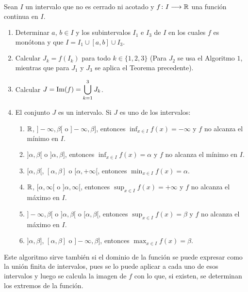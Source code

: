 \begin{algocal}
Sean $I$ un intervalo que no es cerrado ni acotado y $f\colon I\longrightarrow \mathbb{R}$ una función continua en $I$.

\begin{enumerate}
\item Determinar $a$, $b\in I$ y los subintervalos $I_1$ e $I_3$ de $I$ en los cuales $f$ es
    monótona y que $I=I_1\cup [a,b]\cup I_3$.

\item Calcular $J_k = f(I_k)$ para todo $k \in \{1,2,3\}$ (Para $J_2$ se usa el Algoritmo $1$, mientras que para $J_1$ y $J_3$ se aplica el Teorema precedente).

\item Calcular $\displaystyle J = \operatorname{Im}(f) = \bigcup_{k=1}^3 J_k$.

\item El conjunto $J$ es un intervalo. Si $J$ es uno de los intervalos:
    \begin{enumerate}
    \item $\mathbb{R}$, $]-\infty,\beta[$ o $]-\infty,\beta]$, entonces $\displaystyle \inf_{x\in
        I}f(x) = -\infty$ y $f$ no alcanza el mínimo en $I$.

    \item $]\alpha,\beta[$ o $]\alpha,\beta]$, entonces $\displaystyle \inf_{x\in I}f(x) =
        \alpha$ y $f$ no alcanza el mínimo en $I$.

    \item $[\alpha,\beta[$, $[\alpha,\beta]$ o $[\alpha,+\infty [$, entonces $\displaystyle
        \min_{x\in I}f(x) = \alpha$.

    \item $\mathbb{R}$, $[\alpha,\infty[$ o $]\alpha,\infty[$, entonces $\displaystyle \sup_{x\in
        I}f(x) = +\infty$ y $f$ no alcanza el máximo en $I$.

    \item $]-\infty,\beta[$ o $]\alpha,\beta[$ o $[\alpha,\beta[$, entonces $\displaystyle
        \sup_{x\in I}f(x) = \beta$ y $f$ no alcanza el máximo en $I$.

    \item $]\alpha,\beta]$, $[\alpha,\beta]$ o $]-\infty,\beta]$, entonces $\displaystyle
        \max_{x\in I}f(x) = \beta$.
    \end{enumerate}
\end{enumerate}
\end{algocal}

Este algoritmo sirve también si el dominio de la función se puede expresar como la unión finita de
intervalos, pues se lo puede aplicar a cada uno de esos intervalos y luego se calcula la imagen de
$f$ con lo que, si existen, se determinan los extremos de la función.

